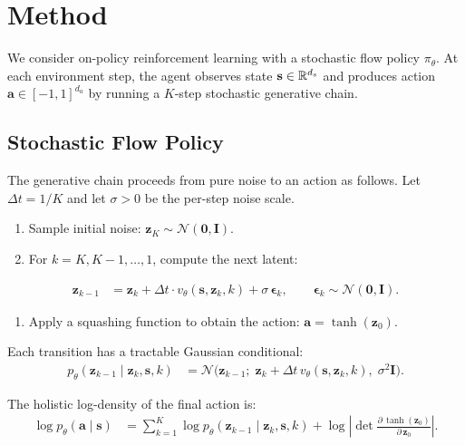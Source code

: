 \section{Method}
\label{sec:method}

We consider on-policy reinforcement learning with a stochastic flow policy
$\pi_\theta$.  At each environment step, the agent observes state
$\mathbf{s}\in\mathbb{R}^{d_s}$ and produces action
$\mathbf{a}\in[-1,1]^{d_a}$ by running a $K$-step stochastic generative
chain.

\subsection{Stochastic Flow Policy}
\label{sec:method:flow}

The generative chain proceeds from pure noise to an action as follows.
Let $\Delta t = 1/K$ and let $\sigma > 0$ be the per-step noise scale.

\begin{enumerate}[leftmargin=*,nosep]
  \item Sample initial noise: $\mathbf{z}_K \sim \mathcal{N}(\mathbf{0},\mathbf{I})$.
  \item For $k = K, K{-}1, \ldots, 1$, compute the next latent:
\end{enumerate}
\begin{align}
  \mathbf{z}_{k-1}
    &= \mathbf{z}_k
       + \Delta t \cdot v_\theta(\mathbf{s}, \mathbf{z}_k, k)
       + \sigma\,\boldsymbol{\epsilon}_k,
  \qquad \boldsymbol{\epsilon}_k \sim \mathcal{N}(\mathbf{0},\mathbf{I}).
  \label{eq:flow_step}
\end{align}
\begin{enumerate}[leftmargin=*,nosep,resume]
  \item Apply a squashing function to obtain the action:
        $\mathbf{a} = \tanh(\mathbf{z}_0)$.
\end{enumerate}

Each transition has a tractable Gaussian conditional:
\begin{align}
  p_\theta(\mathbf{z}_{k-1} \mid \mathbf{z}_k, \mathbf{s}, k)
    &= \mathcal{N}\!\bigl(
         \mathbf{z}_{k-1};\;
         \mathbf{z}_k + \Delta t\, v_\theta(\mathbf{s}, \mathbf{z}_k, k),\;
         \sigma^2 \mathbf{I}
       \bigr).
  \label{eq:per_step_density}
\end{align}

The holistic log-density of the final action is:
\begin{align}
  \log p_\theta(\mathbf{a}\mid\mathbf{s})
    &= \sum_{k=1}^{K}
       \log p_\theta(\mathbf{z}_{k-1}\mid\mathbf{z}_k,\mathbf{s},k)
       + \log\!\left|\det\frac{\partial\,\tanh(\mathbf{z}_0)}
                               {\partial\,\mathbf{z}_0}\right|.
  \label{eq:holistic_logprob}
\end{align}

